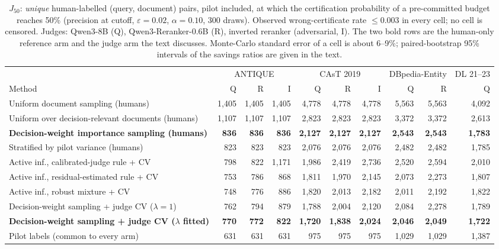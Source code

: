 \documentclass{article}
\newcommand{\eps}{\varepsilon}
\newcommand{\Jfifty}{J_{50}}
\begin{document}
\begin{table}[t]\centering\scriptsize\setlength{\tabcolsep}{2.2pt}
\caption{$\Jfifty$: \emph{unique} human-labelled (query, document) pairs, pilot included, at which the certification probability of a pre-committed budget reaches 50\% (precision at cutoff, $\eps=0.02$, $\alpha=0.10$, 300 draws). Observed wrong-certificate rate $\le0.003$ in every cell; no cell is censored. Judges: Qwen3-8B (Q), Qwen3-Reranker-0.6B (R), inverted reranker (adversarial, I). The two bold rows are the human-only reference arm and the judge arm the text discusses. Monte-Carlo standard error of a cell is about 6--9\%; paired-bootstrap 95\% intervals of the savings ratios are given in the text.}\label{tab:J50}
\begin{tabular}{l rrr rrr rr r}\toprule
 & \multicolumn{3}{c}{ANTIQUE} & \multicolumn{3}{c}{CAsT 2019} & \multicolumn{2}{c}{DBpedia-Entity} & DL 21--23\\
Method & Q & R & I & Q & R & I & Q & R & Q\\\midrule
Uniform document sampling (humans) & 1,405 & 1,405 & 1,405 & 4,778 & 4,778 & 4,778 & 5,563 & 5,563 & 4,092\\
Uniform over decision-relevant documents (humans) & 1,107 & 1,107 & 1,107 & 2,823 & 2,823 & 2,823 & 3,372 & 3,372 & 2,613\\
\textbf{Decision-weight importance sampling (humans)} & \textbf{836} & \textbf{836} & \textbf{836} & \textbf{2,127} & \textbf{2,127} & \textbf{2,127} & \textbf{2,543} & \textbf{2,543} & \textbf{1,783}\\
Stratified by pilot variance (humans) & 823 & 823 & 823 & 2,076 & 2,076 & 2,076 & 2,482 & 2,482 & 1,785\\
Active inf., calibrated-judge rule + CV & 798 & 822 & 1,171 & 1,986 & 2,419 & 2,736 & 2,520 & 2,594 & 2,010\\
Active inf., residual-estimated rule + CV & 753 & 786 & 868 & 1,811 & 1,970 & 2,145 & 2,073 & 2,273 & 1,807\\
Active inf., robust mixture + CV & 748 & 776 & 886 & 1,820 & 2,013 & 2,182 & 2,011 & 2,192 & 1,822\\
Decision-weight sampling + judge CV ($\lambda=1$) & 762 & 794 & 879 & 1,788 & 2,004 & 2,120 & 2,084 & 2,278 & 1,789\\
\textbf{Decision-weight sampling + judge CV ($\lambda$ fitted)} & \textbf{770} & \textbf{772} & \textbf{822} & \textbf{1,720} & \textbf{1,838} & \textbf{2,024} & \textbf{2,046} & \textbf{2,049} & \textbf{1,722}\\\midrule
Pilot labels (common to every arm) & 631 & 631 & 631 & 975 & 975 & 975 & 1,029 & 1,029 & 1,387\\\bottomrule
\end{tabular}
\end{table}
\end{document}
